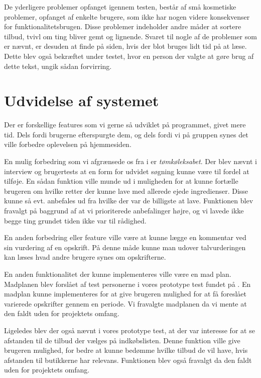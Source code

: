 De yderligere problemer opfanget igennem testen, består af små kosmetiske problemer, opfanget af enkelte brugere, som ikke har nogen videre konsekvenser for funktionalitetsbrugen.
Disse problemer indeholder andre måder at sortere tilbud, tvivl om ting bliver gemt og lignende.
Svaret til nogle af de problemer som er nævnt, er desuden at finde på siden, hvis der blot bruges lidt tid på at læse.
Dette blev også bekræftet under testet, hvor en person der valgte at gøre brug af dette tekst, ungik sådan forvirring.


\section{Udvidelse af systemet}\label{udvidelse}

Der er forskellige features som vi gerne så udviklet på programmet, givet mere tid. Dels fordi brugerne efterspurgte dem, og dels fordi vi på gruppen synes det ville forbedre oplevelsen på hjemmesiden.

En mulig forbedring som vi afgrænsede os fra i  er \textit{tømkøleksabet}.
Der blev nævnt i interview og brugertests at en form for udvidet søgning kunne være til fordel at tilføje.
En sådan funktion ville munde ud i muligheden for at kunne fortælle brugeren om hvilke retter der kunne lave med allerede ejede ingredienser.
Disse kunne så evt. anbefales ud fra hvilke der var de billigste at lave.
Funktionen blev fravalgt på baggrund af at vi prioriterede anbefalinger højre, og vi lavede ikke begge ting grundet tiden ikke var til rådighed.

En anden forbedring eller feature ville være at kunne lægge en kommentar ved sin vurdering af en opskrift.
På denne måde kunne man udover talvurderingen kan læses hvad andre brugere synes om opskrifterne. 

En anden funktionalitet der kunne implementeres ville være en mad plan.
Madplanen blev forslået af test personerne i vores prototype test fundet på \label{ch:protorespons}.
En madplan kunne implementeres for at give brugeren mulighed for at få foreslået varierede opskrifter gennem en periode.
Vi fravalgte madplanen da vi mente at den faldt uden for projektets omfang.

Ligeledes blev der også nævnt i vores prototype test, at der var interesse for at se afstanden til de tilbud der vælges på indkøbslisten.
Denne funktion ville give brugeren mulighed, for bedre at kunne bedømme hvilke tilbud de vil have, hvis afstanden til butikkerne har relevans.
Funktionen blev også fravalgt da den faldt uden for projektets omfang.